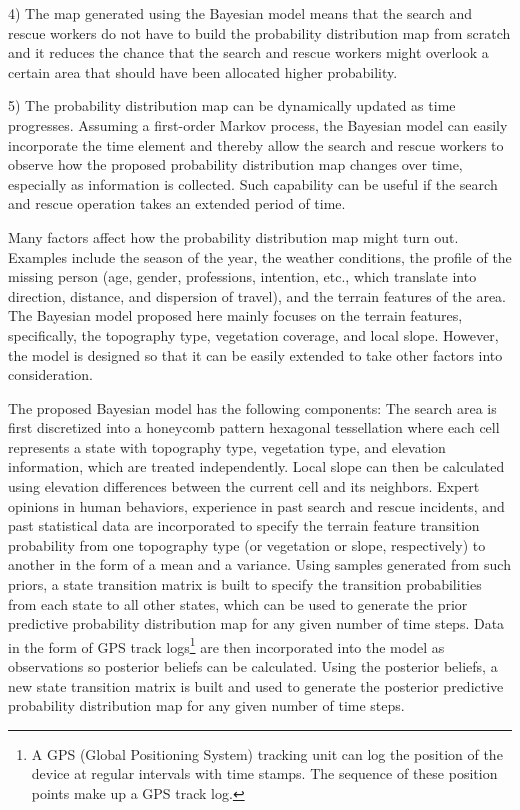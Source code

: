 \documentclass[smallextended,natbib]{svjour3}
\begin{document}
4) The map generated using the Bayesian model means that the search and rescue workers do not have to build the probability distribution map from scratch and it reduces the chance that the search and rescue workers might overlook a certain area that should have been allocated higher probability.

5) The probability distribution map can be dynamically updated as time progresses. Assuming a first-order Markov process, the Bayesian model can easily incorporate the time element and thereby allow the search and rescue workers to observe how the proposed probability distribution map changes over time, especially as information is collected. Such capability can be useful if the search and rescue operation takes an extended period of time.

Many factors affect how the probability distribution map might turn out. Examples include the season of the year, the weather conditions, the profile of the missing person (age, gender, professions, intention, etc., which translate into direction, distance, and dispersion of travel), and the terrain features of the area. The Bayesian model proposed here mainly focuses on the terrain features, specifically, the topography type, vegetation coverage, and local slope. However, the model is designed so that it can be easily extended to take other factors into consideration.

The proposed Bayesian model has the following components: The search area is first discretized into a honeycomb pattern hexagonal tessellation where each cell represents a state with topography type, vegetation type, and elevation information, which are treated independently. Local slope can then be calculated using elevation differences between the current cell and its neighbors. Expert opinions in human behaviors, experience in past search and rescue incidents, and past statistical data are incorporated to specify the terrain feature transition probability from one topography type (or vegetation or slope, respectively) to another in the form of a mean and a variance. Using samples generated from such priors, a state transition matrix is built to specify the transition probabilities from each state to all other states, which can be used to generate the prior predictive probability distribution map for any given number of time steps. Data in the form of GPS track logs\footnote{A GPS (Global Positioning System) tracking unit can log the position of the device at regular intervals with time stamps. The sequence of these position points make up a GPS track log.} are then incorporated into the model as observations so posterior beliefs can be calculated. Using the posterior beliefs, a new state transition matrix is built and used to generate the posterior predictive probability distribution map for any given number of time steps.
\end{document}

